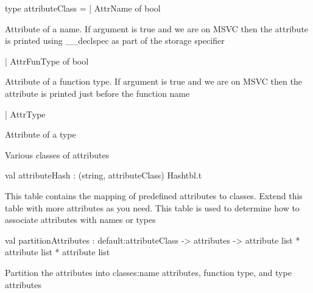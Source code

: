 \documentclass[11pt]{article}
\begin{document}
\label{type:Cil.attributeClass}\begin{ocamldoccode}
type attributeClass =
  | AttrName of bool
\end{ocamldoccode}
\begin{ocamldoccomment}
Attribute of a name. If argument is true and we are on MSVC then 
            the attribute is printed using \_\_declspec as part of the storage 
            specifier
\end{ocamldoccomment}
\begin{ocamldoccode}
  | AttrFunType of bool
\end{ocamldoccode}
\begin{ocamldoccomment}
Attribute of a function type. If argument is true and we are on 
            MSVC then the attribute is printed just before the function name
\end{ocamldoccomment}
\begin{ocamldoccode}
  | AttrType
\end{ocamldoccode}
\begin{ocamldoccomment}
Attribute of a type
\end{ocamldoccomment}
\begin{ocamldocdescription}
Various classes of attributes


\end{ocamldocdescription}




\label{val:Cil.attributeHash}\begin{ocamldoccode}
val attributeHash : (string, attributeClass) Hashtbl.t
\end{ocamldoccode}
\begin{ocamldocdescription}
This table contains the mapping of predefined attributes to classes. 
    Extend this table with more attributes as you need. This table is used to 
    determine how to associate attributes with names or types


\end{ocamldocdescription}




\label{val:Cil.partitionAttributes}\begin{ocamldoccode}
val partitionAttributes :
  default:attributeClass ->
  attributes ->
  attribute list * attribute list * attribute list
\end{ocamldoccode}
\begin{ocamldocdescription}
Partition the attributes into classes:name attributes, function type, 
    and type attributes


\end{ocamldocdescription}
\end{document}
